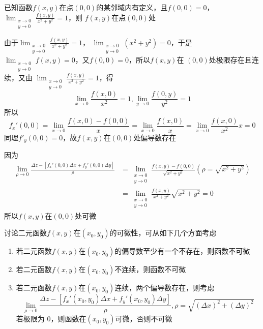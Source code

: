 \documentclass{article}
\begin{document}
\begin{examplle}[]
已知函数\(f(x,y)\)在点\((0,0)\)的某邻域内有定义，且\(f(0,0)=0\)，
\(\displaystyle\lim_{\substack{x\to0\\y\to0}}\frac{f(x,y)}{x^2+y^2}=1\)，则
\(f(x,y)\)在点\((0,0)\)处

由于\(\displaystyle\lim_{\substack{x\to0\\y\to0}}\frac{f(x,y)}{x^2+y^2}=1\)，
\(\lim_{\substack{x\to0\\y\to0}}(x^2+y^2)=0\)，于是
\(\lim_{\substack{x\to0\\y\to0}}f(x,y)=0\)，又\(f(0,0)=0\)，所以\(f(x,y)\)在
\((0,0)\)处极限存在且连续，又由
\(\lim_{\substack{x\to0\\y\to0}}\frac{f(x,y)}{x^2+y^2}=1\)，得
\begin{equation*}
\lim_{x\to0}\frac{f(x,0)}{x^2}=1,
\lim_{y\to0}\frac{f(0,y)}{y^2}=1
\end{equation*}
所以
\begin{equation*}
f_x'(0,0)=\lim_{x\to0}\frac{f(x,0)-f(0,0)}{x}=
\lim_{x\to0}\frac{f(x,0)}{x}=\lim_{x\to0}\frac{f(x,0)}{x^2}x=0
\end{equation*}
同理\(f'_y(0,0)=0\)，故\(f(x,y)\)在\((0,0)\)处偏导数存在

因为
\begin{align*}
\lim_{\rho\to0}\frac{\Delta z-[f_x'(0,0)\Delta x+f_y'(0,0)\Delta y]}{\rho}&=
\lim_{\substack{x\to0\\y\to0}}\frac{f(x,y)-f(0,0)}{\sqrt{x^2+y^2}}(\rho=\sqrt{x^2+y^2})\\
&=\lim_{\substack{x\to0\\y\to0}}\frac{f(x,y)}{x^2+y^2}\sqrt{x^2+y^2}=0
\end{align*}
所以\(f(x,y)\)在\((0,0)\)处可微
\end{examplle}

\begin{remark}
讨论二元函数\(f(x,y)\)在\((x_0,y_0)\)的可微性，可从如下几个方面考虑
\begin{enumerate}
\item 若二元函数\(f(x,y)\)在\((x_0,y_0)\)的偏导数至少有一个不存在，则函数不可微
\item 若二元函数\(f(x,y)\)在\((x_0,y_0)\)不连续，则函数不可微
\item 若二元函数\(f(x,y)\)在\((x_0,y_0)\)连续，两个偏导数存在，则考虑
\begin{equation*}
\lim_{\rho\to0}\frac{\Delta z-[f_x'(x_0,y_0)\Delta x+f_y'(x_0,y_0)\Delta y]}{\rho},
\rho=\sqrt{(\Delta x)^2+(\Delta y)^2}
\end{equation*}
若极限为 0，则函数在\((x_0,y_0)\)可微，否则不可微
\end{enumerate}
\end{remark}
\end{document}
